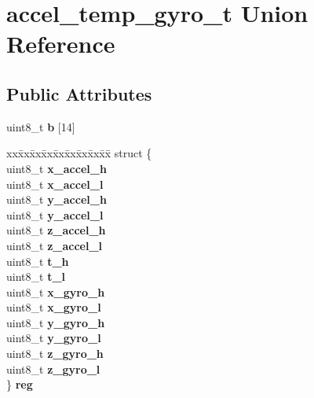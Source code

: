 \hypertarget{unionaccel__temp__gyro__t}{}\section{accel\+\_\+temp\+\_\+gyro\+\_\+t Union Reference}
\label{unionaccel__temp__gyro__t}
\subsection*{Public Attributes}
\begin{DoxyCompactItemize}
\item 
\mbox{\label{unionaccel__temp__gyro__t_afe00504a2566e0b450c3a464a87d1234}} 
uint8\+\_\+t {\bfseries b} \mbox{[}14\mbox{]}
\item 
\mbox{\label{unionaccel__temp__gyro__t_a77d8b71798803540f561318e738c196c}} 
\begin{tabbing}
xx\=xx\=xx\=xx\=xx\=xx\=xx\=xx\=xx\=\kill
struct \{\\
\>uint8\_t {\bfseries x\_accel\_h}\\
\>uint8\_t {\bfseries x\_accel\_l}\\
\>uint8\_t {\bfseries y\_accel\_h}\\
\>uint8\_t {\bfseries y\_accel\_l}\\
\>uint8\_t {\bfseries z\_accel\_h}\\
\>uint8\_t {\bfseries z\_accel\_l}\\
\>uint8\_t {\bfseries t\_h}\\
\>uint8\_t {\bfseries t\_l}\\
\>uint8\_t {\bfseries x\_gyro\_h}\\
\>uint8\_t {\bfseries x\_gyro\_l}\\
\>uint8\_t {\bfseries y\_gyro\_h}\\
\>uint8\_t {\bfseries y\_gyro\_l}\\
\>uint8\_t {\bfseries z\_gyro\_h}\\
\>uint8\_t {\bfseries z\_gyro\_l}\\
\} {\bfseries reg}\\


\end{tabbing}
\end{DoxyCompactItemize}
